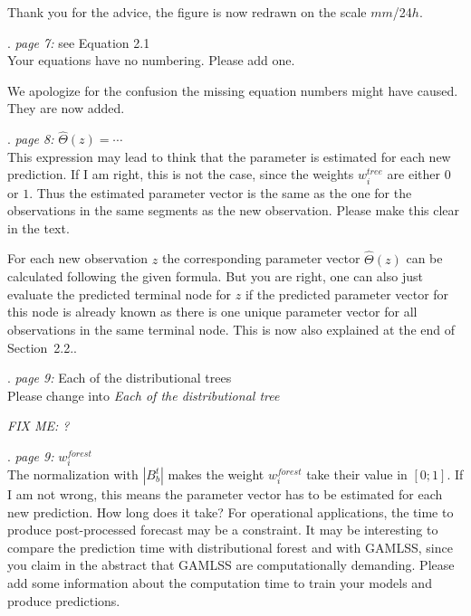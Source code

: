 \documentclass[american,foldmarks=false,noconfig]{uibklttr}
\newenvironment{review}{\fontshape{\itdefault}\fontseries{\bfdefault} \selectfont \smallskip}{\par}
\begin{document}
Thank you for the advice, the figure is now redrawn on the scale $mm$/24$h$.


\begin{review}
7. {\color{quotecolor}\textit{page 7:} see Equation 2.1}\\
Your equations have no numbering. Please add one.
\end{review}

We apologize for the confusion the missing equation numbers 
might have caused. They are now added.

\begin{review}
8. {\color{quotecolor}\textit{page 8:} $\hat{\Theta}(z) = \cdots$}\\
This expression may lead to think that the parameter is estimated 
for each new prediction. If I am right, this is not the case, 
since the weights $w_i^{tree}$ are either $0$ or $1$. Thus the 
estimated parameter vector is the same as the one for the 
observations in the same segments as the new observation.
Please make this clear in the text.
\end{review}

For each new observation $z$ the corresponding 
parameter vector $\hat{\Theta}(z)$ can be calculated following 
the given formula. But you are right, one can also just evaluate 
the predicted terminal node for $z$ if the predicted parameter
vector for this node is already known as there is one unique 
parameter vector for all observations in the same terminal node.
This is now also explained at the end of Section~2.2..


\begin{review}
9. {\color{quotecolor}\textit{page 9:} Each of the distributional trees}\\
Please change into \textit{Each of the distributional tree}
\end{review}

\textit{FIX ME: ?}

\begin{review}
10. {\color{quotecolor}\textit{page 9:} $w_i^{forest}$}\\
The normalization with $|B_b^t|$ makes the weight $w_i^{forest}$ 
take their value in $[0; 1]$. If I am not wrong, this means the 
parameter vector has to be estimated for each new prediction. 
How long does it take? For operational applications, the time 
to produce post-processed forecast may be a constraint. It may 
be interesting to compare the prediction time with distributional 
forest and with GAMLSS, since you claim in the abstract that
GAMLSS are computationally demanding. Please add some information
about the computation time to train your models and produce predictions.
\end{review}
\end{document}
